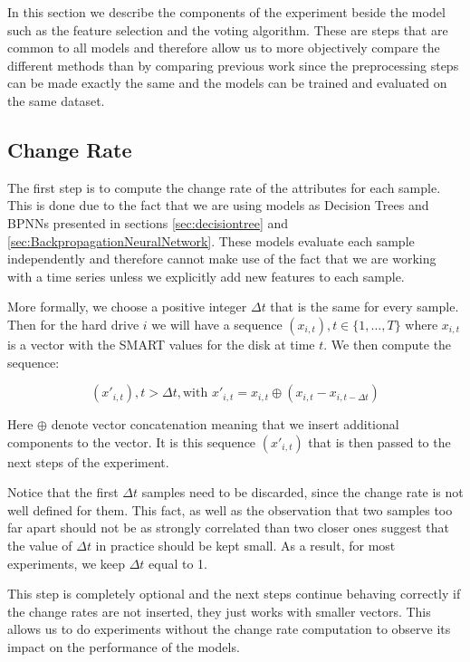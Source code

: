 In this section we describe the components of the experiment beside the model such as the feature selection and the voting algorithm.
These are steps that are common to all models and therefore allow us to more objectively compare the different methods than by comparing previous work since the preprocessing steps can be made exactly the same and the models can be trained and evaluated on the same dataset.

\subsection{Change Rate}

The first step is to compute the change rate of the attributes for each sample.
This is done due to the fact that we are using models as Decision Trees and BPNNs presented in sections \ref{sec:decisiontree} and \ref{sec:BackpropagationNeuralNetwork}.
These models evaluate each sample independently and therefore cannot make use of the fact that we are working with a time series unless we explicitly add new features to each sample.

More formally, we choose a positive integer $\Delta t$ that is the same for every sample.
Then for the hard drive $i$ we will have a sequence $(x_{i,t}), t \in \{1,\dots,T\}$ where $x_{i,t}$ is a vector with the SMART values for the disk at time $t$.
We then compute the sequence:

\begin{equation}\label{eq:change_rate}
(x'_{i,t}), t > \Delta t, \text{with } x'_{i,t} = x_{i,t} \oplus (x_{i,t} - x_{i,t-\Delta t})
\end{equation}

Here $\oplus$ denote vector concatenation meaning that we insert additional components to the vector.
It is this sequence $(x'_{i,t})$ that is then passed to the next steps of the experiment.

Notice that the first $\Delta t$ samples need to be discarded, since the change rate is not well defined for them.
This fact, as well as the observation that two samples too far apart should not be as strongly correlated than two closer ones suggest that the value of $\Delta t$ in practice should be kept small.
As a result, for most experiments, we keep $\Delta t$ equal to 1.

This step is completely optional and the next steps continue behaving correctly if the change rates are not inserted, they just works with smaller vectors.
This allows us to do experiments without the change rate computation to observe its impact on the performance of the models.

